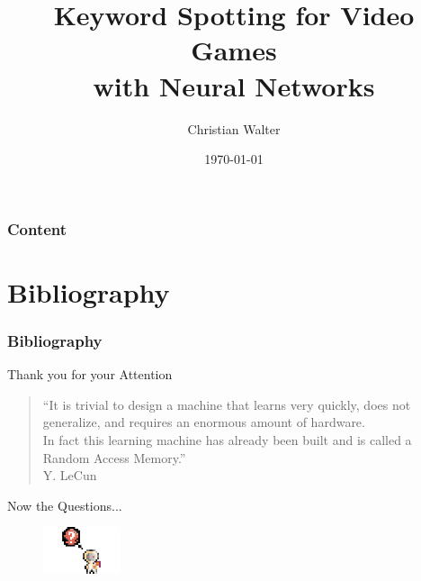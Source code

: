\documentclass{beamer}
\title[Keyword Spotting for Video Games with Neural Networks]{Keyword Spotting for Video Games\\with Neural Networks}
\author{Christian Walter}
\date{\today}
\begin{document}
\titleframe

\begin{frame}
  \frametitle{Content}
  \tableofcontents
\end{frame}













\section{Bibliography}

\begin{frame}
  \frametitle{Bibliography}
  \printbibliography
\end{frame}

\begin{frame}
  \Large
  \centering
  \vfill
  Thank you for your Attention
  \begin{quote}
    \scriptsize
    \vspace{0.5cm}
    \enquote{It is trivial to design a machine that learns very quickly, does not generalize, and requires an enormous amount of hardware.\\
    In fact this learning machine has already been built and is called a Random Access Memory.}\\
    \vspace{0.25cm}
    Y. LeCun
  \end{quote}
  \vspace{0.25cm}
  Now the Questions...
  \begin{figure} \includegraphics[width=0.2\textwidth]{../6_game/figs/game_design_mechanic_bubble_question.png} \end{figure}
\end{frame}
\end{document}

